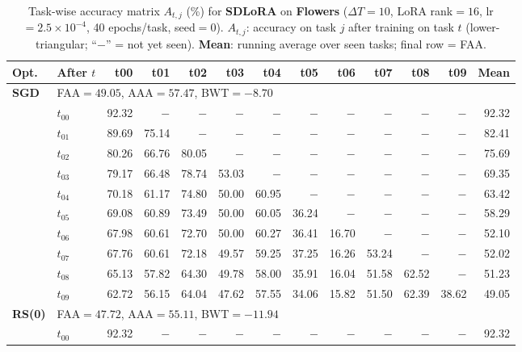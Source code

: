 \begin{table}[ht]
\centering
\caption{%
  Task-wise accuracy matrix $A_{t,j}$ (\%) for \textbf{SDLoRA} on \textbf{Flowers} ($\Delta T=10$, LoRA rank$=16$, lr$=2.5\times10^{-4}$, 40 epochs/task, seed$=0$).
  $A_{t,j}$: accuracy on task $j$ after training on task $t$  (lower-triangular; ``$-$'' = not yet seen).
  \textbf{Mean}: running average over seen tasks; final row = FAA.
}
\label{tab:raw_sdlora_flowers}
\setlength{\tabcolsep}{2.8pt}
\renewcommand{\arraystretch}{0.88}
\scriptsize
\begin{tabular}{@{}l l r r r r r r r r r r r@{}}
\toprule
\textbf{Opt.} & \textbf{After $t$} & \textbf{t00} & \textbf{t01} & \textbf{t02} & \textbf{t03} & \textbf{t04} & \textbf{t05} & \textbf{t06} & \textbf{t07} & \textbf{t08} & \textbf{t09} & \textbf{Mean} \\
\midrule
\multirow{11}{*}{\textbf{SGD}} & \multicolumn{12}{l}{\quad\small FAA$=49.05$,\; AAA$=57.47$,\; BWT$=-8.70$} \\
 & $t_{00}$ & 92.32 & $-$ & $-$ & $-$ & $-$ & $-$ & $-$ & $-$ & $-$ & $-$ & 92.32 \\
 & $t_{01}$ & 89.69 & 75.14 & $-$ & $-$ & $-$ & $-$ & $-$ & $-$ & $-$ & $-$ & 82.41 \\
 & $t_{02}$ & 80.26 & 66.76 & 80.05 & $-$ & $-$ & $-$ & $-$ & $-$ & $-$ & $-$ & 75.69 \\
 & $t_{03}$ & 79.17 & 66.48 & 78.74 & 53.03 & $-$ & $-$ & $-$ & $-$ & $-$ & $-$ & 69.35 \\
 & $t_{04}$ & 70.18 & 61.17 & 74.80 & 50.00 & 60.95 & $-$ & $-$ & $-$ & $-$ & $-$ & 63.42 \\
 & $t_{05}$ & 69.08 & 60.89 & 73.49 & 50.00 & 60.05 & 36.24 & $-$ & $-$ & $-$ & $-$ & 58.29 \\
 & $t_{06}$ & 67.98 & 60.61 & 72.70 & 50.00 & 60.27 & 36.41 & 16.70 & $-$ & $-$ & $-$ & 52.10 \\
 & $t_{07}$ & 67.76 & 60.61 & 72.18 & 49.57 & 59.25 & 37.25 & 16.26 & 53.24 & $-$ & $-$ & 52.02 \\
 & $t_{08}$ & 65.13 & 57.82 & 64.30 & 49.78 & 58.00 & 35.91 & 16.04 & 51.58 & 62.52 & $-$ & 51.23 \\
 & $t_{09}$ & 62.72 & 56.15 & 64.04 & 47.62 & 57.55 & 34.06 & 15.82 & 51.50 & 62.39 & 38.62 & 49.05 \\
\midrule
\multirow{11}{*}{\textbf{RS(0)}} & \multicolumn{12}{l}{\quad\small FAA$=47.72$,\; AAA$=55.11$,\; BWT$=-11.94$} \\
 & $t_{00}$ & 92.32 & $-$ & $-$ & $-$ & $-$ & $-$ & $-$ & $-$ & $-$ & $-$ & 92.32 \\

\end{tabular}
\end{table}
